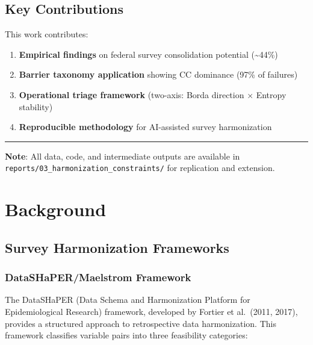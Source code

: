 \documentclass[
  letterpaper,
]{report}
\providecommand{\tightlist}{%
  \setlength{\itemsep}{0pt}\setlength{\parskip}{0pt}}
\begin{document}
\section{Key Contributions}\label{key-contributions}

This work contributes:

\begin{enumerate}
\def\labelenumi{\arabic{enumi}.}
\tightlist
\item
  \textbf{Empirical findings} on federal survey consolidation potential
  (\textasciitilde44\%)
\item
  \textbf{Barrier taxonomy application} showing CC dominance (97\% of
  failures)
\item
  \textbf{Operational triage framework} (two-axis: Borda direction ×
  Entropy stability)
\item
  \textbf{Reproducible methodology} for AI-assisted survey harmonization
\end{enumerate}

\begin{center}\rule{0.5\linewidth}{0.5pt}\end{center}

\textbf{Note}: All data, code, and intermediate outputs are available in
\texttt{reports/03\_harmonization\_constraints/} for replication and
extension.


\chapter{Background}\label{background}

\section{Survey Harmonization
Frameworks}\label{survey-harmonization-frameworks}

\subsection{DataSHaPER/Maelstrom
Framework}\label{datashapermaelstrom-framework}

The DataSHaPER (Data Schema and Harmonization Platform for
Epidemiological Research) framework, developed by Fortier et al.~(2011,
2017), provides a structured approach to retrospective data
harmonization. This framework classifies variable pairs into three
feasibility categories:
\end{document}
